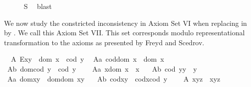 \begin{isabellebody}
%
\isadelimproof
\ \ \ \ %
\endisadelimproof
%
\isatagproof
{}\isamarkupfalse%
\ S{}\ \isamarkupfalse%
\ blast%
\endisatagproof
{\isafoldproof}%
%
\isadelimproof
%
\endisadelimproof
%
\isamarkuptrue%
%
\begin{isamarkuptext}%
We now study the constricted inconsistency in Axiom Set VI when replacing  \isa{{\isasymsimeq}}  
 in   by  \isa{{\isasymcong}}. We call this Axiom Set VII. This set corresponds
 modulo representational transformation to the axioms as presented by Freyd and Scedrov.%
\end{isamarkuptext}\isamarkuptrue%
\ \ A{}{\isacharcolon}\ {\isachardoublequoteopen}E{\isacharparenleft}x{\isasymcdot}y{\isacharparenright}\ \isactrlbold {\isasymleftrightarrow}\ dom\ x\ {\isasymcong}\ cod\ y{\isachardoublequoteclose}\ \isanewline
\ A{}a{\isacharcolon}\ {\isachardoublequoteopen}cod{\isacharparenleft}dom\ x{\isacharparenright}\ {\isasymcong}\ dom\ x\ {\isachardoublequoteclose}\ \ \ \isanewline
\ A{}b{\isacharcolon}\ {\isachardoublequoteopen}dom{\isacharparenleft}cod\ y{\isacharparenright}\ {\isasymcong}\ cod\ y{\isachardoublequoteclose}\ \ \ \isanewline
\ A{}a{\isacharcolon}\ {\isachardoublequoteopen}x{\isasymcdot}{\isacharparenleft}dom\ x{\isacharparenright}\ {\isasymcong}\ x{\isachardoublequoteclose}\ \ \isanewline
\ A{}b{\isacharcolon}\ {\isachardoublequoteopen}{\isacharparenleft}cod\ y{\isacharparenright}{\isasymcdot}y\ {\isasymcong}\ y{\isachardoublequoteclose}\ \ \isanewline
\ A{}a{\isacharcolon}\ {\isachardoublequoteopen}dom{\isacharparenleft}x{\isasymcdot}y{\isacharparenright}\ {\isasymcong}\ dom{\isacharparenleft}{\isacharparenleft}dom\ x{\isacharparenright}{\isasymcdot}y{\isacharparenright}{\isachardoublequoteclose}\ \ \isanewline
\ A{}b{\isacharcolon}\ {\isachardoublequoteopen}cod{\isacharparenleft}x{\isasymcdot}y{\isacharparenright}\ {\isasymcong}\ cod{\isacharparenleft}x{\isasymcdot}{\isacharparenleft}cod\ y{\isacharparenright}{\isacharparenright}{\isachardoublequoteclose}\ \ \isanewline
\ \ A{}{\isacharcolon}\ {\isachardoublequoteopen}x{\isasymcdot}{\isacharparenleft}y{\isasymcdot}z{\isacharparenright}\ {\isasymcong}\ {\isacharparenleft}x{\isasymcdot}y{\isacharparenright}{\isasymcdot}z{\isachardoublequoteclose}%
\begin{isamarkuptext}%

\end{isamarkuptext}
\end{isabellebody}
